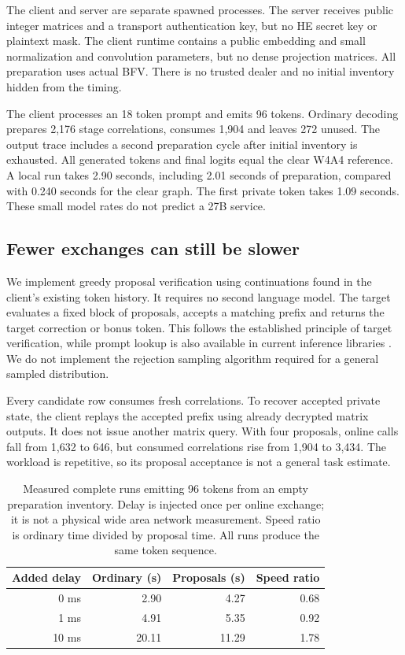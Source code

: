 \documentclass[10pt,twocolumn]{article}
\begin{document}
The client and server are separate spawned processes. The server receives
public integer matrices and a transport authentication key, but no HE secret
key or plaintext mask. The client runtime contains a public embedding and small
normalization and convolution parameters, but no dense projection matrices.
All preparation uses actual BFV. There is no trusted dealer and no initial
inventory hidden from the timing.

The client processes an 18 token prompt and emits 96 tokens. Ordinary decoding
prepares 2,176 stage correlations, consumes 1,904 and leaves 272 unused.
The output trace includes a second preparation cycle after initial inventory
is exhausted. All generated tokens and final logits equal the clear W4A4
reference. A local run takes 2.90 seconds, including 2.01 seconds of preparation,
compared with 0.240 seconds for the clear graph. The first private token takes
1.09 seconds. These small model rates do not predict a 27B service.

\subsection{Fewer exchanges can still be slower}
We implement greedy proposal verification using continuations found in the
client's existing token history. It requires no second language model. The
target evaluates a fixed block of proposals, accepts a matching prefix and
returns the target correction or bonus token. This follows the established
principle of target verification, while prompt lookup is also available in
current inference libraries \cite{speculative,assisted}. We do not implement
the rejection sampling algorithm required for a general sampled distribution.

Every candidate row consumes fresh correlations. To recover accepted private
state, the client replays the accepted prefix using already decrypted matrix
outputs. It does not issue another matrix query. With four proposals, online
calls fall from 1,632 to 646, but consumed correlations rise from 1,904 to 3,434.
The workload is repetitive, so its proposal acceptance is not a general task
estimate.

\begin{table}[t]
\centering\small
\setlength{\tabcolsep}{4.5pt}
\begin{tabular}{rrrr}
\toprule
Added delay & Ordinary (s) & Proposals (s) & Speed ratio\\
\midrule
0 ms & 2.90 & 4.27 & 0.68\\
1 ms & 4.91 & 5.35 & 0.92\\
10 ms & 20.11 & 11.29 & 1.78\\
\bottomrule
\end{tabular}
\caption{Measured complete runs emitting 96 tokens from an empty preparation
inventory. Delay is injected once per online exchange; it is not a physical
wide area network measurement. Speed ratio is ordinary time divided by proposal
time. All runs produce the same token sequence.}
\label{tab:spec}
\end{table}
\end{document}
